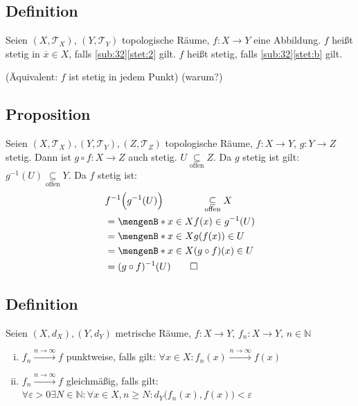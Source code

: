 \subsection[Definition von Stetigkeit in topologischen Räumen]{Definition} %
\label{sub:33}
Seien $(X, \mathcal{T}_X)$, $(Y, \mathcal{T}_Y)$ topologische Räume, $f : X \to Y$ eine Abbildung. $f$ heißt stetig in $\overline{x} \in X$, falls 
\ref{sub:32}\ref{stet:2} gilt. $f$ heißt stetig, falls \ref{sub:32}\ref{stet:b} gilt. 

(Äquivalent: $f$ ist stetig in jedem Punkt) \hfill (warum?)

\subsection[Proposition über Stetigkeit der Komposition in topologischen Räumen]{Proposition} %
\label{sub:34}
Seien $(X,\mathcal{T}_X), (Y,\mathcal{T}_Y), (Z,\mathcal{T}_Z)$ topologische Räume, $f : X \to Y$, $g : Y \to Z$ stetig. Dann ist $g \circ f : X \to Z$ auch stetig.
$U \underset{\text{offen}}{\subseteq} Z$. Da $g$ stetig ist gilt: $g ^{-1} (U) \underset{\text{offen}}{\subseteq} Y$. Da $f$ stetig ist:
\begin{align*}
	& f ^{-1} \Big(g ^{-1} (U)\Big) \qquad \qquad \underset{\text{offen}}{\subseteq} X \\
	&= \set[x \in X]{f(x) \in g ^{-1} (U)} \\
	&= \set[x \in X]{g(f(x)) \in U} \\  
	&= \set[x \in X]{(g \circ f) (x) \in U} \\
	&= (g \circ f) ^{-1}(U) \tag*{$\square$} 
\end{align*}

\subsection[Definition von punktweiser und gleichmäßiger Konvergenz in metrischen Räumen]{Definition} %
\label{sub:35}
Seien $(X,d_X), (Y,d_Y)$ metrische Räume, $f : X \to Y$, $f_n : X \to Y$, $n \in \mathds{N}$ 
\begin{enumerate}[(i)]
	\item $f_n \xrightarrow{n \to \infty} f$ punktweise, falls gilt: $\forall x \in X : f_n (x) \xrightarrow{n \to \infty} f(x)$
	\item $f_n \xrightarrow{n \to \infty} f$ gleichmäßig, falls gilt: 
	$\forall \varepsilon >0 \exists N \in \mathds{N} : \forall x \in X, n \ge N : d_Y \big(f_n(x), f(x) \big) < \varepsilon$
\end{enumerate}


